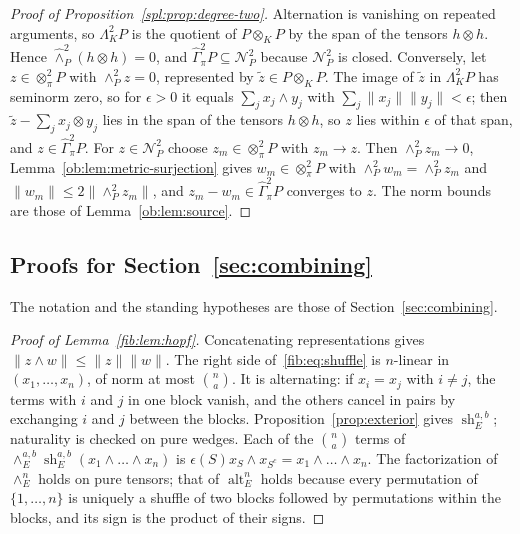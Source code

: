 \documentclass[11pt]{amsart}
\theoremstyle{definition}
\theoremstyle{remark}
\numberwithin{equation}{section}
\newcommand{\norm}[1]{\lVert #1\rVert}
\theoremstyle{plain}
\theoremstyle{definition}
\theoremstyle{plain}
\newcommand{\cN}{\mathcal N}
\begin{document}
\begin{proof}[Proof of Proposition~\ref{spl:prop:degree-two}]
Alternation is vanishing on repeated arguments, so $\Lambda^2_KP$ is the quotient of $P\otimes_KP$ by the span of the
tensors $h\otimes h$. Hence $\widehat\wedge^2_P(h\otimes h)=0$, and $\widehat\Gamma^2_\pi P\subseteq\cN^2_P$ because
$\cN^2_P$ is closed. Conversely, let $z\in\otimes^2_\pi P$ with $\wedge^2_Pz=0$, represented by $\tilde z\in P\otimes_KP$.
The image of $\tilde z$ in $\Lambda^2_KP$ has seminorm zero, so for $\epsilon>0$ it equals $\sum_jx_j\wedge y_j$ with
$\sum_j\norm{x_j}\norm{y_j}<\epsilon$; then $\tilde z-\sum_jx_j\otimes y_j$ lies in the span of the tensors $h\otimes h$,
so $z$ lies within $\epsilon$ of that span, and $z\in\widehat\Gamma^2_\pi P$. For $z\in\cN^2_P$ choose $z_m\in\otimes^2_\pi P$ with $z_m\to z$. Then
$\wedge^2_Pz_m\to0$, Lemma~\ref{ob:lem:metric-surjection} gives $w_m\in\otimes^2_\pi P$ with $\wedge^2_Pw_m=\wedge^2_Pz_m$
and $\norm{w_m}\le2\norm{\wedge^2_Pz_m}$, and $z_m-w_m\in\widehat\Gamma^2_\pi P$ converges to $z$. The norm bounds are
those of Lemma~\ref{ob:lem:source}.
\end{proof}
\subsection{Proofs for Section~\ref{sec:combining}}\label{dfr:ssec:combining}

The notation and the standing hypotheses are those of Section~\ref{sec:combining}.

\begin{proof}[Proof of Lemma~\ref{fib:lem:hopf}]
Concatenating representations gives $\norm{z\wedge w}\le\norm z\norm w$. The right side of~\eqref{fib:eq:shuffle} is
$n$\nobreakdash-linear in $(x_1,\dots,x_n)$, of norm at most $\binom na$. It is alternating: if $x_i=x_j$ with $i\ne j$,
the terms with $i$ and $j$ in one block vanish, and the others cancel in pairs by exchanging $i$ and $j$ between the
blocks. Proposition~\ref{prop:exterior} gives $\operatorname{sh}^{a,b}_E$; naturality is checked on pure wedges. Each of
the $\binom na$ terms of $\wedge^{a,b}_E\operatorname{sh}^{a,b}_E(x_1\wedge\dots\wedge x_n)$ is
$\epsilon(S)x_S\wedge x_{S^c}=x_1\wedge\dots\wedge x_n$. The factorization of $\wedge^n_E$ holds on pure tensors; that of
$\operatorname{alt}^n_E$ holds because every permutation of $\{1,\dots,n\}$ is uniquely a shuffle of two blocks followed
by permutations within the blocks, and its sign is the product of their signs.
\end{proof}
\end{document}
